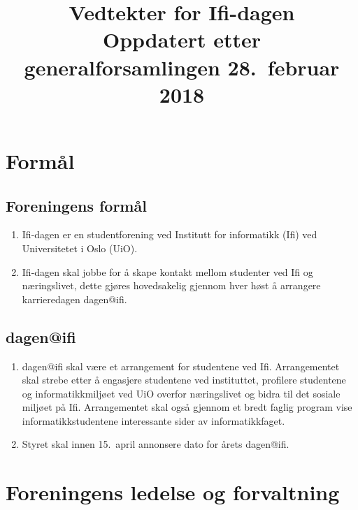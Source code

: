 \documentclass[norsk,a4paper]{article}
\title{\textbf{Vedtekter for Ifi-dagen} \\
{\large Oppdatert etter generalforsamlingen 28.\ februar 2018}}
\date{}
\begin{document}
\maketitle{}
\thispagestyle{fancy}

\section{Formål}
\subsection{Foreningens formål}
\begin{enumerate}
    \item{Ifi-dagen er en studentforening ved Institutt for informatikk (Ifi) ved Universitetet i Oslo (UiO).}
    \item{Ifi-dagen skal jobbe for å skape kontakt mellom studenter ved Ifi og næringslivet, dette gjøres hovedsakelig gjennom hver høst å arrangere karrieredagen dagen@ifi.}
\end{enumerate}
\subsection{dagen@ifi}
\begin{enumerate}
    \item{dagen@ifi skal være et arrangement for studentene ved Ifi. Arrangementet skal strebe etter å engasjere studentene ved instituttet, profilere studentene og informatikkmiljøet ved UiO overfor næringslivet og bidra til det sosiale miljøet på Ifi. Arrangementet skal også gjennom et bredt faglig program vise informatikkstudentene interessante sider av informatikkfaget.}
    \item{Styret skal innen 15.\ april annonsere dato for årets dagen@ifi.}
\end{enumerate}

\section{Foreningens ledelse og forvaltning}
\end{document}
